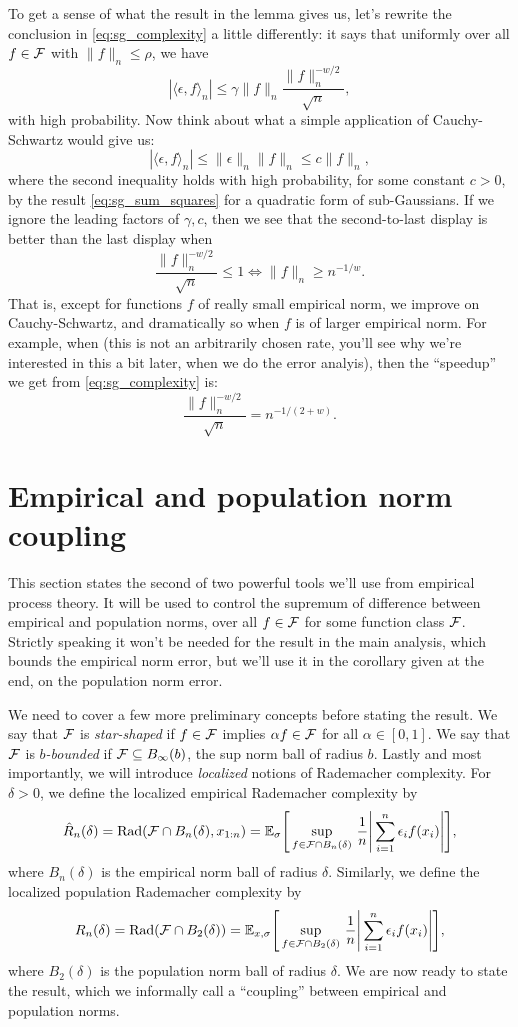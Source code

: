 \documentclass{article}
\begin{document}
To get a sense of what the result in the lemma gives us, let's rewrite the
conclusion in \eqref{eq:sg_complexity} a little differently: it says that
uniformly over all $f \in \mathcal{F}$ with $\|f\|_n \leq \rho$, we have  
\[
|\langle \epsilon, f \rangle_n| \leq \gamma \|f\|_n \frac{\|f\|_n^{-w/2}}
{\sqrt n}, 
\]
with high probability. Now think about what a simple application of
Cauchy-Schwartz would give us: 
\[
|\langle \epsilon, f \rangle_n| \leq \|\epsilon\|_n \|f\|_n \leq c \|f\|_n, 
\]
where the second inequality holds with high probability, for some constant  
$c>0$, by the result \eqref{eq:sg_sum_squares} for a quadratic form of
sub-Gaussians. If we ignore the leading factors of $\gamma, c$, then we see that
the second-to-last display is better than the last display when   
\[
\frac{\|f\|_n^{-w/2}}{\sqrt n} \leq 1 \iff \|f\|_n \geq n^{-1/w}.
\]
That is, except for functions $f$ of really small empirical norm, we improve on
Cauchy-Schwartz, and dramatically so when $f$ is of larger empirical norm. For
example, when  (this is not an arbitrarily
chosen rate, you'll see why we're interested in this a bit later, when we do the
error analyis), then the ``speedup'' we get from \eqref{eq:sg_complexity} is:   
\[
\frac{\|f\|_n^{-w/2}}{\sqrt n} = n^{-1/(2+w)}.
\]

\section{Empirical and population norm coupling}

This section states the second of two powerful tools we'll use from empirical 
process theory. It will be used to control the supremum of difference between
empirical and population norms, over all $f \in \mathcal{F}$ for some function class
$\mathcal{F}$. Strictly speaking it won't be needed for the result in the main analysis,
which bounds the empirical norm error, but we'll use it in the corollary given
at the end, on the population norm error. 

We need to cover a few more preliminary concepts before stating the result. We
say that $\mathcal{F}$ is \emph{star-shaped} if $f \in \mathcal{F}$ implies $\alpha f \in \mathcal{F}$
for all $\alpha \in [0,1]$. We say that $\mathcal{F}$ is \emph{$b$-bounded} if $\mathcal{F}
\subseteq B_\infty(b)$, the sup norm ball of radius $b$. Lastly and most
importantly, we will introduce \emph{localized} notions of Rademacher
complexity. For $\delta>0$, we define the localized empirical Rademacher
complexity by    
\[
\hat{R}_n(\delta) = \mathrm{Rad}(\mathcal{F} \cap B_n(\delta), x_{1:n}) 
= \mathbb{E}_\sigma \Bigg[ \sup_{f \in \mathcal{F} \cap B_n(\delta)} \, \frac{1}{n} \Bigg|  
\sum_{i=1}^n \epsilon_i f(x_i) \Bigg| \Bigg],
\]
where $B_n(\delta)$ is the empirical norm ball of radius $\delta$. Similarly, we
define the localized population Rademacher complexity by   
\[
R_n(\delta) = \mathrm{Rad}(\mathcal{F} \cap B_2(\delta))
= \mathbb{E}_{x,\sigma} \Bigg[ \sup_{f \in \mathcal{F} \cap B_2(\delta)} \, \frac{1}{n} \Bigg|  
\sum_{i=1}^n \epsilon_i f(x_i) \Bigg| \Bigg],
\]
where $B_2(\delta)$ is the population norm ball of radius $\delta$. We are now
ready to state the result, which we informally call a ``coupling'' between
empirical and population norms.
\end{document}
